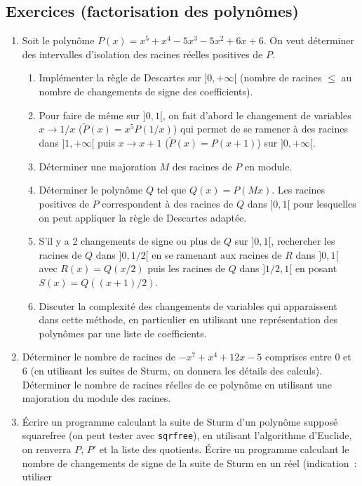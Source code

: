 \documentclass[a4paper,11pt]{book}
\begin{document}
\begin{giacjshere}
\section{Exercices (factorisation des polynômes)}
\begin{enumerate}
\item Soit le polyn\^ome $P(x)=x^{5}+x^{4}-5x^{3}-5x^{2}+6x+6$.
On veut d\'eterminer des intervalles d'isolation des racines r\'eelles
positives de $P$.
\begin{enumerate} 
\item Impl\'ementer la r\`egle de Descartes sur $]0,+\infty[$
(nombre de racines $\leq$ au nombre de changements de signe des
coefficients).
\item Pour faire de m\^eme sur $]0,1[$, on fait d'abord
le changement de variables $x\rightarrow 1/x$ 
($\tilde{P}(x)=x^5P(1/x)$) qui permet
de se ramener \`a des racines dans $]1,+\infty[$ puis  
$x \rightarrow x+1$ ($\tilde{P}(x)=P(x+1)$) sur $]0,+\infty[$.
\item D\'eterminer une majoration $M$ des racines de $P$ en module.
\item D\'eterminer le polyn\^ome $Q$ tel que $Q(x)=P(Mx)$. 
Les racines positives de $P$ correspondent
\`a des racines de $Q$ dans $]0,1[$ pour lesquelles on peut
appliquer la r\`egle de Descartes adapt\'ee.
\item S'il y a 2 changements de signe ou plus de $Q$ sur $]0,1[$,
rechercher les racines de $Q$ dans $]0,1/2[$ en se ramenant
aux racines de $R$ dans $]0,1[$ avec $R(x)=Q(x/2)$
puis les racines de $Q$ dans $]1/2,1[$ en posant $S(x)=Q((x+1)/2)$.
\item Discuter la complexit\'e des changements de variables
qui apparaissent dans cette m\'ethode, en particulier en utilisant
une repr\'esentation des polyn\^omes par une liste de coefficients.
\end{enumerate}
\item Déterminer le nombre de racines de $-x^7+x^4+12x-5$ comprises
entre 0 et 6 (en utilisant les suites de Sturm, on donnera les
d\'etails des calculs). D\'eterminer le nombre de racines r\'eelles
de ce polyn\^ome en utilisant une majoration du module des racines.
\item \'Ecrire un programme calculant la suite de Sturm d'un polynôme
supposé squarefree (on peut tester avec \verb|sqrfree|), en utilisant
l'algorithme d'Euclide, on renverra $P$, $P'$ et la liste des quotients.
\'Ecrire un programme calculant le nombre de changements de signe
de la suite de Sturm en un r\'eel (indication~: utiliser 

\end{enumerate}
\end{giacjshere}
\end{document}
